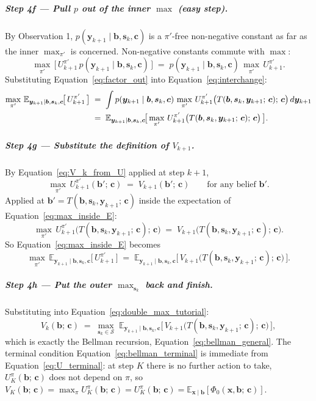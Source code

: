 \documentclass[11pt]{article}
\newcommand{\bc}{\bm{c}}
\newcommand{\bx}{\bm{x}}
\newcommand{\by}{\bm{y}}
\newcommand{\bs}{\bm{s}}
\newcommand{\bb}{\bm{b}}
\newcommand{\E}{\mathbb{E}}
\begin{document}
\subparagraph{Step 4f --- Pull $p$ out of the inner $\max$ (easy step).}  By Observation 1, $p(\by_{k+1} \mid \bb, \bs_k, \bc)$ is a $\pi'$-free non-negative constant as far as the inner $\max_{\pi'}$ is concerned.  Non-negative constants commute with $\max$:
\begin{equation}
\max_{\pi'}\, \bigl[\, U^{\pi'}_{k+1}\, p(\by_{k+1} \mid \bb, \bs_k, \bc)\, \bigr] \;=\; p(\by_{k+1} \mid \bb, \bs_k, \bc)\, \max_{\pi'}\, U^{\pi'}_{k+1}.
\label{eq:factor_out}
\end{equation}
Substituting Equation~\eqref{eq:factor_out} into Equation~\eqref{eq:interchange}:
\begin{align}
\max_{\pi'}\, \E_{\by_{k+1} \mid \bb, \bs_k, \bc}\!\bigl[\, U^{\pi'}_{k+1}\, \bigr]
\;&=\; \int p(\by_{k+1} \mid \bb, \bs_k, \bc)\, \max_{\pi'}\, U^{\pi'}_{k+1}\bigl(T(\bb, \bs_k, \by_{k+1};\, \bc);\, \bc\bigr)\, d\by_{k+1} \notag \\
\;&=\; \E_{\by_{k+1} \mid \bb, \bs_k, \bc}\!\bigl[\, \max_{\pi'}\, U^{\pi'}_{k+1}\bigl(T(\bb, \bs_k, \by_{k+1};\, \bc);\, \bc\bigr)\, \bigr].
\label{eq:max_inside_E}
\end{align}

\subparagraph{Step 4g --- Substitute the definition of $V_{k+1}$.}  By Equation~\eqref{eq:V_k_from_U} applied at step $k+1$,
\begin{equation}
\max_{\pi'}\, U^{\pi'}_{k+1}(\bb';\, \bc) \;=\; V_{k+1}(\bb';\, \bc)\qquad \text{for any belief } \bb'.
\end{equation}
Applied at $\bb' = T(\bb, \bs_k, \by_{k+1};\, \bc)$ inside the expectation of Equation~\eqref{eq:max_inside_E}:
\begin{equation}
\max_{\pi'}\, U^{\pi'}_{k+1}\bigl(T(\bb, \bs_k, \by_{k+1};\, \bc);\, \bc\bigr) \;=\; V_{k+1}\bigl(T(\bb, \bs_k, \by_{k+1};\, \bc);\, \bc\bigr).
\end{equation}
So Equation~\eqref{eq:max_inside_E} becomes
\begin{equation}
\max_{\pi'}\, \E_{\by_{k+1} \mid \bb, \bs_k, \bc}\!\bigl[\, U^{\pi'}_{k+1}\, \bigr]
\;=\; \E_{\by_{k+1} \mid \bb, \bs_k, \bc}\!\bigl[\, V_{k+1}\bigl(T(\bb, \bs_k, \by_{k+1};\, \bc);\, \bc\bigr)\, \bigr].
\end{equation}

\subparagraph{Step 4h --- Put the outer $\max_{\bs_k}$ back and finish.}  Substituting into Equation~\eqref{eq:double_max_tutorial}:
\begin{equation}
V_k(\bb;\, \bc) \;=\; \max_{\bs_k \in \mathcal{S}}\; \E_{\by_{k+1} \mid \bb, \bs_k, \bc}\!\bigl[\, V_{k+1}\bigl(T(\bb, \bs_k, \by_{k+1};\, \bc);\, \bc\bigr)\, \bigr],
\end{equation}
which is exactly the Bellman recursion, Equation~\eqref{eq:bellman_general}.  The terminal condition Equation~\eqref{eq:bellman_terminal} is immediate from Equation~\eqref{eq:U_terminal}: at step $K$ there is no further action to take, $U^\pi_K(\bb;\, \bc)$ does not depend on $\pi$, so $V_K(\bb;\, \bc) = \max_\pi U^\pi_K(\bb;\, \bc) = U^\pi_K(\bb;\, \bc) = \E_{\bx \mid \bb}[\Phi_0(\bx, \bb;\, \bc)]$.
\end{document}

